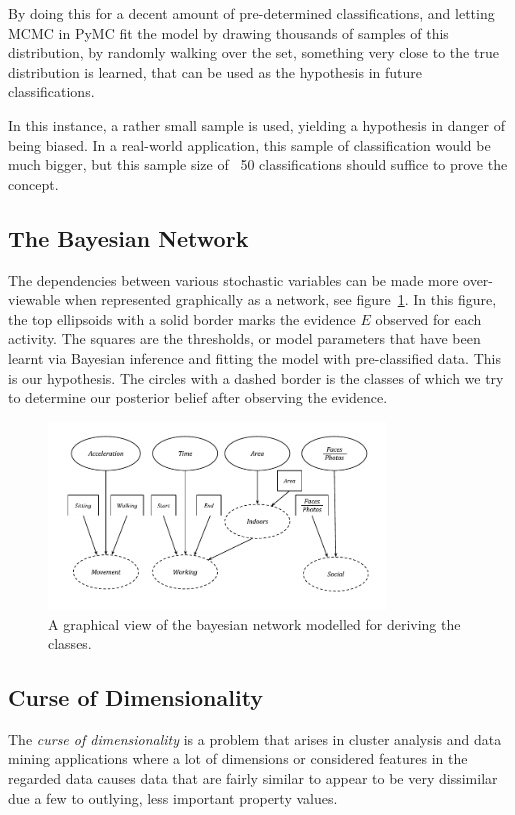 By doing this for a decent amount of pre-determined classifications, 
and letting MCMC in PyMC fit the model by drawing thousands of samples of this 
distribution, by randomly walking over the set, something very close to the 
true distribution is learned, that can be used as the hypothesis in future 
classifications. 

In this instance, a rather small sample is used, yielding a hypothesis 
in danger of being biased. In a real-world application, this sample of
classification would be much bigger, but this sample size of ~50 classifications
should suffice to prove the concept. 

\subsection{The Bayesian Network}
The dependencies between various stochastic variables can be made more 
over-viewable when represented graphically as a network, see 
figure~\ref{fig:bayes-network}. In this figure, the top ellipsoids with a solid 
border marks the evidence $E$ observed for each activity. The squares are the 
thresholds, or model parameters that have been learnt via Bayesian inference
and fitting the model with pre-classified data. This is our hypothesis. 
The circles with a dashed border is the classes of which we try to determine 
our posterior belief after observing the evidence.

\begin{figure}[ht]
    \centering
    \includegraphics[width=0.8\textwidth]{images/bayes_network.pdf}
    \caption{A graphical view of the bayesian network modelled for deriving the
        classes. \label{fig:bayes-network} }
\end{figure}

\subsection{Curse of Dimensionality}
The \emph{curse of dimensionality} is a problem that arises in cluster 
analysis and data mining applications where a lot of dimensions or 
considered features in the regarded data causes data that are fairly 
similar to appear to be very dissimilar due a few to outlying, less 
important property values. 

